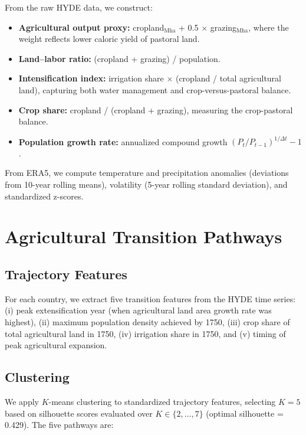 \documentclass[12pt,letterpaper]{article}
\begin{document}
From the raw HYDE data, we construct:
\begin{itemize}[nosep]
  \item \textbf{Agricultural output proxy:} cropland$_{\text{Mha}}$ + 0.5 $\times$ grazing$_{\text{Mha}}$, where the weight reflects lower caloric yield of pastoral land.
  \item \textbf{Land--labor ratio:} (cropland + grazing) / population.
  \item \textbf{Intensification index:} irrigation share $\times$ (cropland / total agricultural land), capturing both water management and crop-versus-pastoral balance.
  \item \textbf{Crop share:} cropland / (cropland + grazing), measuring the crop-pastoral balance.
  \item \textbf{Population growth rate:} annualized compound growth $(P_t / P_{t-1})^{1/\Delta t} - 1$.
\end{itemize}

From ERA5, we compute temperature and precipitation anomalies (deviations from 10-year rolling means), volatility (5-year rolling standard deviation), and standardized z-scores.

\section{Agricultural Transition Pathways}
\label{sec:pathways}

\subsection{Trajectory Features}

For each country, we extract five transition features from the HYDE time series: (i) peak extensification year (when agricultural land area growth rate was highest), (ii) maximum population density achieved by 1750, (iii) crop share of total agricultural land in 1750, (iv) irrigation share in 1750, and (v) timing of peak agricultural expansion.

\subsection{Clustering}

We apply $K$-means clustering to standardized trajectory features, selecting $K=5$ based on silhouette scores evaluated over $K \in \{2, \ldots, 7\}$ (optimal silhouette = 0.429). The five pathways are:
\end{document}
